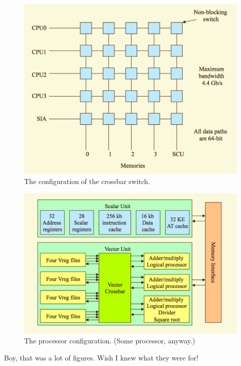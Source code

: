 \begin{figure}
\centering
\includegraphics[width=0.5\linewidth]{screenshot094}
\caption{The configuration of the crossbar switch.}
\label{fig:screenshot094}
\end{figure}

\begin{figure}
\centering
\includegraphics[width=0.5\linewidth]{screenshot095}
\caption[The processor configuration.]{The processor configuration. (Some processor, anyway.)}
\label{fig:screenshot095}
\end{figure}

\pagebreak

Boy, that was a lot of figures. Wish I knew what they were for!